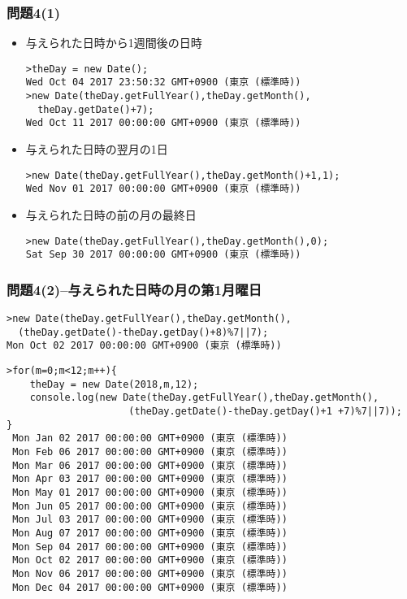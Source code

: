   \begin{frame}[containsverbatim]\scriptsize
   \frametitle{問題4(1)}
  \begin{itemize}
 \item 与えられた日時から1週間後の日時\\
\begin{Verbatim}
>theDay = new Date();
Wed Oct 04 2017 23:50:32 GMT+0900 (東京 (標準時))
>new Date(theDay.getFullYear(),theDay.getMonth(),
  theDay.getDate()+7);
Wed Oct 11 2017 00:00:00 GMT+0900 (東京 (標準時))
\end{Verbatim}
 \item 与えられた日時の翌月の1日\\
\begin{Verbatim}
>new Date(theDay.getFullYear(),theDay.getMonth()+1,1);
Wed Nov 01 2017 00:00:00 GMT+0900 (東京 (標準時))
\end{Verbatim}
 \item 与えられた日時の前の月の最終日\\
\begin{Verbatim}
>new Date(theDay.getFullYear(),theDay.getMonth(),0);
Sat Sep 30 2017 00:00:00 GMT+0900 (東京 (標準時))
\end{Verbatim}
  \end{itemize} 
  \end{frame}
  \begin{frame}[containsverbatim]\scriptsize
   \frametitle{問題4(2)--与えられた日時の月の第1月曜日}
\begin{verbatim}
>new Date(theDay.getFullYear(),theDay.getMonth(),
  (theDay.getDate()-theDay.getDay()+8)%7||7);
Mon Oct 02 2017 00:00:00 GMT+0900 (東京 (標準時))
\end{verbatim}
\begin{Verbatim}
>for(m=0;m<12;m++){
    theDay = new Date(2018,m,12);
    console.log(new Date(theDay.getFullYear(),theDay.getMonth(),
                     (theDay.getDate()-theDay.getDay()+1 +7)%7||7));
}
 Mon Jan 02 2017 00:00:00 GMT+0900 (東京 (標準時))
 Mon Feb 06 2017 00:00:00 GMT+0900 (東京 (標準時))
 Mon Mar 06 2017 00:00:00 GMT+0900 (東京 (標準時))
 Mon Apr 03 2017 00:00:00 GMT+0900 (東京 (標準時))
 Mon May 01 2017 00:00:00 GMT+0900 (東京 (標準時))
 Mon Jun 05 2017 00:00:00 GMT+0900 (東京 (標準時))
 Mon Jul 03 2017 00:00:00 GMT+0900 (東京 (標準時))
 Mon Aug 07 2017 00:00:00 GMT+0900 (東京 (標準時))
 Mon Sep 04 2017 00:00:00 GMT+0900 (東京 (標準時))
 Mon Oct 02 2017 00:00:00 GMT+0900 (東京 (標準時))
 Mon Nov 06 2017 00:00:00 GMT+0900 (東京 (標準時))
 Mon Dec 04 2017 00:00:00 GMT+0900 (東京 (標準時))
\end{Verbatim}
  \end{frame}
